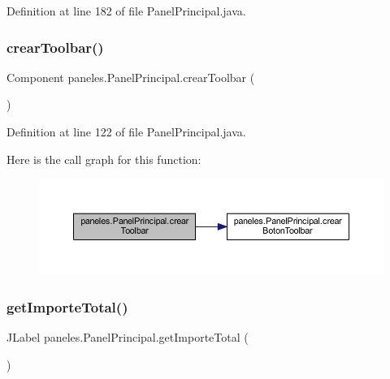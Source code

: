 Definition at line 182 of file Panel\+Principal.\+java.

\mbox{\label{classpaneles_1_1_panel_principal_accd82709ae4701f14d1b5a4bbb8f3aae}} 
\subsubsection{\texorpdfstring{crear\+Toolbar()}{crearToolbar()}}
{\footnotesize\ttfamily Component paneles.\+Panel\+Principal.\+crear\+Toolbar (\begin{DoxyParamCaption}{ }\end{DoxyParamCaption})}



Definition at line 122 of file Panel\+Principal.\+java.

Here is the call graph for this function\+:
\nopagebreak
\begin{figure}[H]
\begin{center}
\leavevmode
\includegraphics[width=350pt]{classpaneles_1_1_panel_principal_accd82709ae4701f14d1b5a4bbb8f3aae_cgraph}
\end{center}
\end{figure}
\mbox{\label{classpaneles_1_1_panel_principal_a5ee2138a32b7b6bc6a0f7b3bd68f4821}} 
\subsubsection{\texorpdfstring{get\+Importe\+Total()}{getImporteTotal()}}
{\footnotesize\ttfamily J\+Label paneles.\+Panel\+Principal.\+get\+Importe\+Total (\begin{DoxyParamCaption}{ }\end{DoxyParamCaption})}



